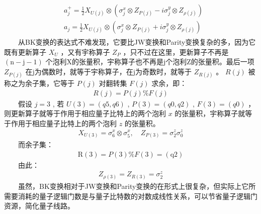 \documentclass[a4paper,11pt,english]{sphinxmanual}
\begin{document}
\sphinxAtStartPar
{}
\begin{equation*}
\begin{split}\begin{aligned} &a_{j}^{+}=\frac{1}{2} X_{U(j)} \otimes\left(\sigma_{j}^{x} \otimes Z_{P(j)}-i \sigma_{j}^{y} \otimes Z_{\rho(j)}\right) \\ &a_{j}=\frac{1}{2} X_{U(j)} \otimes\left(\sigma_{j}^{x} \otimes Z_{P(j)}+i \sigma_{j}^{y} \otimes Z_{\rho(j)}\right) \end{aligned}\end{split}
\end{equation*}
\sphinxAtStartPar
  从B\sphinxhyphen{}K变换的表达式不难发现，它要比J\sphinxhyphen{}W变换和Parity变换复杂的多，因为它既有更新算子 \(X_U\) ，又有宇称算子 \(Z_P\) ，只不过在这里，更新算子不再是 \((\mathrm{n}-\mathrm{j}-1)\) 个泡利X的张量积，宇称算子也不再是j个泡利Z的张量积。最后一项 \(Z_{P(j)}\) 在j为偶数时，就等于宇称算子，在j为奇数时，就等于 \(Z_{R(j)}\) 。 \(R(j)\) 被称之为余子集，它等于  \(P(j)\) 对翻转集  \(F(j)\) 求余，即：
\begin{equation*}
\begin{split}R(j)=P(j) \% F(j)\end{split}
\end{equation*}
\sphinxAtStartPar
  假设 \(j=3\) , 若 \(U(3)=(q5,q6)\) ,  \(P(3)=(q0,q2)\) ,  \(F(3)=(q0)\) ，则更新算子就等于作用于相应量子比特上的两个泡利  \(x\) 的张量积，宇称算子就等于作用于相应量子比特上的两个泡利  \(z\) 的张量积。
\begin{equation*}
\begin{split}X_{U(3)}=\sigma_{6}^{x} \otimes \sigma_{5}^{x}, \quad Z_{P(3)}=\sigma_{2}^{z} \sigma_{0}^{z}\end{split}
\end{equation*}
\sphinxAtStartPar
  而余子集：
\begin{equation*}
\begin{split}\mathrm{R}(3)=P(3) \% F(3)=(\mathrm{q} 2)\end{split}
\end{equation*}
\sphinxAtStartPar
  由此：
\begin{equation*}
\begin{split}Z_{\rho(3)}=Z_{R(3)}=\sigma_{2}^{z}\end{split}
\end{equation*}
\sphinxAtStartPar
  虽然，B\sphinxhyphen{}K变换相对于J\sphinxhyphen{}W变换和Parity变换的在形式上很复杂，但实际上它所需要消耗的量子逻辑门数是与量子比特数的对数成线性关系，可以节省量子逻辑门资源，简化量子线路。
\end{document}
